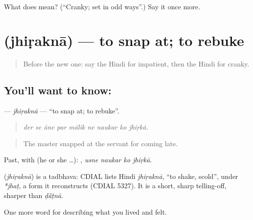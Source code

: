\begin{tcolorbox}[breakable,colback=teal!4,colframe=teal!35!black,title={Before you move on}]
What does  mean? (\textquotedblleft{}Cranky; set in odd ways\textquotedblright{}.) Say it once more.
\end{tcolorbox}
\section[\texorpdfstring{\hi{झिड़कना} (jhiṛaknā)}{झिड़कना (jhiṛaknā)}]{ (jhiṛaknā) — to snap at; to rebuke}

\label{lesson:HI-C468-jhirakna}



\begin{quote}
Before the new one: say the Hindi for impatient, then the Hindi for cranky.
\end{quote}

\subsection*{You'll want to know: }
\textbf{} — \emph{jhiṛaknā} — \textquotedblleft{}to snap at; to rebuke\textquotedblright{}.

\begin{quote}
        
\end{quote}

\begin{quote}
\emph{der se āne par mālik ne naukar ko jhiṛkā.}
\end{quote}

\begin{quote}
The master snapped at the servant for coming late.
\end{quote}

Past, with  (he or she …):    , \emph{usne naukar ko jhiṛkā}.

\begin{cousinweb}
\textbf{} (\emph{jhiṛaknā}) is a tadbhava: CDIAL lists Hindi \emph{jhiṛaknā}, \textquotedblleft{}to shake, scold\textquotedblright{}, under \emph{*jhaṭ}, a form it reconstructs (CDIAL 5327). It is a short, sharp telling-off, sharper than \emph{ḍā̃ṭnā}.
\end{cousinweb}

\begin{grammarlens}[title={What you've built}]
One more word for describing what you lived and felt.
\end{grammarlens}


